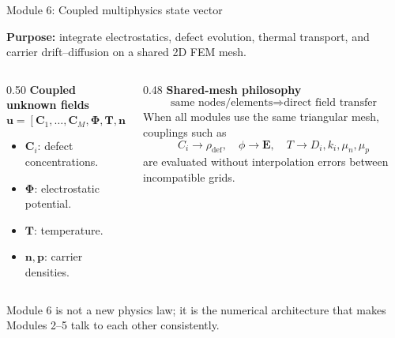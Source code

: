 \documentclass[aspectratio=169,9pt]{beamer}
\newcommand{\E}{\bm{E}}
\newcommand{\vect}[1]{\bm{#1}}
\begin{document}
\begin{frame}{Module 6: Coupled multiphysics state vector}
\footnotesize
\vspace{-3mm}
\begin{bluebox}
\centering
\textbf{Purpose:} integrate electrostatics, defect evolution, thermal transport, and carrier drift--diffusion on a shared 2D FEM mesh.
\end{bluebox}

\vspace{1mm}
\begin{columns}[T,totalwidth=\textwidth]
\begin{column}{0.50\textwidth}
\textbf{Coupled unknown fields}
\begin{equation*}
\boxed{\vect{u}=\left[\vect{C}_1,\ldots,\vect{C}_M,\vect{\Phi},\vect{T},\vect{n},\vect{p}\right]^T}
\end{equation*}
\begin{itemize}\setlength\itemsep{0.4mm}
\item \(\vect{C}_i\): defect concentrations.
\item \(\vect{\Phi}\): electrostatic potential.
\item \(\vect{T}\): temperature.
\item \(\vect{n},\vect{p}\): carrier densities.
\end{itemize}
\end{column}
\begin{column}{0.48\textwidth}
\textbf{Shared-mesh philosophy}
\begin{equation*}
\boxed{\text{same nodes/elements} \Rightarrow \text{direct field transfer}}
\end{equation*}
\small
When all modules use the same triangular mesh, couplings such as
\begin{equation*}
C_i\rightarrow \rho_{\mathrm{def}},\quad
\phi\rightarrow \E,\quad
T\rightarrow D_i,k_i,\mu_n,\mu_p
\end{equation*}
are evaluated without interpolation errors between incompatible grids.
\end{column}
\end{columns}

\vspace{1mm}
\begin{greenbox}
\centering\scriptsize
Module 6 is not a new physics law; it is the numerical architecture that makes Modules 2--5 talk to each other consistently.
\end{greenbox}
\end{frame}
\end{document}
